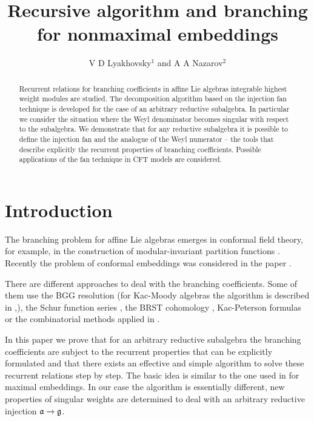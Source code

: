 \documentclass[12pt]{iopart}
\theoremstyle{definition}
\begin{document}
\title{Recursive algorithm and branching for nonmaximal embeddings}
\author{V D Lyakhovsky$^1$ and A A Nazarov$^2$}
\address{$^{1,2}$ Theoretical Department, SPb State University,
198904, Sankt-Petersburg, Russia }

\begin{abstract}
  Recurrent relations for branching coefficients in affine Lie algebras
  integrable highest weight modules are studied. The decomposition algorithm
  based on the injection fan technique is developed for the case of an arbitrary
  reductive subalgebra. In particular we consider the situation where
  the Weyl denominator becomes singular with respect to the subalgebra.
  We demonstrate
  that for any reductive subalgebra it is possible to define the
  injection fan and the analogue of the Weyl numerator -- the tools that describe
  explicitly the recurrent properties of branching coefficients.
  Possible applications of the fan technique in CFT models are considered.
\end{abstract}
\submitto{\JPA}

\section{Introduction}
\label{sec:introduction}

The branching problem for affine Lie algebras emerges in conformal field theory, for example,
in the construction of modular-invariant partition functions \cite{difrancesco1997cft}.
Recently the problem of conformal embeddings was considered in the paper \cite{coquereaux2008conformal}.

There are different approaches to deal with the branching coefficients. Some of them use the BGG
resolution \cite{bernstein1975differential} (for Kac-Moody algebras the algorithm is described in
\cite{kac1990idl},\cite{wakimoto2001idl}), the Schur function series \cite{fauser2006new}, the BRST
cohomology \cite{Hwang:1994yr}, Kac-Peterson formulas \cite{kac1990idl,quella2002branching} or the
combinatorial methods applied in \cite{feigin707principal}.

In this paper we prove that
for an arbitrary reductive subalgebra the branching coefficients are subject to
the recurrent properties that can be explicitly formulated and that there exists
an effective and simple algorithm to solve these recurrent relations step by step.
The basic idea is similar to the one used in \cite{ilyin812pbc} for maximal embeddings.
In our case the algorithm is essentially different, new properties of singular weights
are determined to deal with an arbitrary reductive injection $\frak{a} \rightarrow \frak{g}$.
\end{document}
